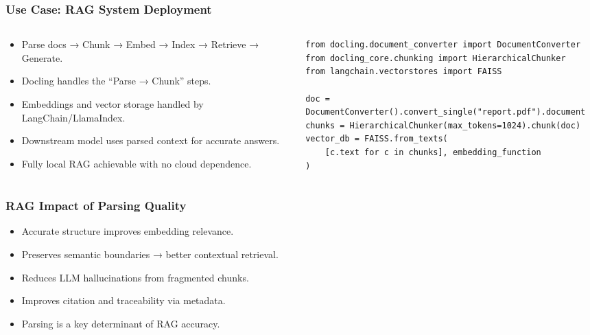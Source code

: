 \begin{frame}[fragile]\frametitle{Use Case: RAG System Deployment}
\begin{columns}
    \begin{column}[T]{0.5\linewidth}
      \begin{itemize}
        \item Parse docs → Chunk → Embed → Index → Retrieve → Generate.
        \item Docling handles the “Parse → Chunk” steps.
        \item Embeddings and vector storage handled by LangChain/LlamaIndex.
        \item Downstream model uses parsed context for accurate answers.
        \item Fully local RAG achievable with no cloud dependence.
      \end{itemize}
    \end{column}
    \begin{column}[T]{0.5\linewidth}
      \begin{lstlisting}
from docling.document_converter import DocumentConverter
from docling_core.chunking import HierarchicalChunker
from langchain.vectorstores import FAISS

doc = DocumentConverter().convert_single("report.pdf").document
chunks = HierarchicalChunker(max_tokens=1024).chunk(doc)
vector_db = FAISS.from_texts(
    [c.text for c in chunks], embedding_function
)
      \end{lstlisting}
    \end{column}
  \end{columns}
\end{frame}

\begin{frame}[fragile]\frametitle{RAG Impact of Parsing Quality}
      \begin{itemize}
        \item Accurate structure improves embedding relevance.
        \item Preserves semantic boundaries → better contextual retrieval.
        \item Reduces LLM hallucinations from fragmented chunks.
        \item Improves citation and traceability via metadata.
        \item Parsing is a key determinant of RAG accuracy.
      \end{itemize}
\end{frame}

